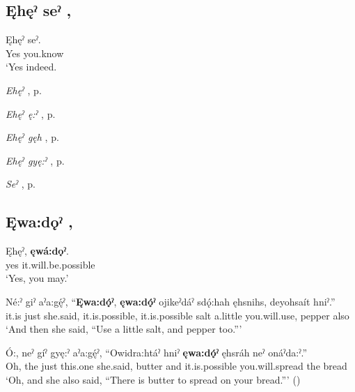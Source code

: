 \subsection*{\textbf{Ęhęˀ seˀ} , } \label{p:[ęhęˀ seˀ]}

\ea
\label{ex:enpart11}
\gll Ęhęˀ seˀ.\\
Yes you.know\\
\glt ‘Yes indeed.
\z

\begin{CayugaRelated}
\item \textit{Ehęˀ} , p. \pageref{p:[ęhęˀ]}\\
\item \textit{Ehęˀ ę:ˀ} , p. \pageref{p:[ęhęˀ ę:ˀ]}\\
\item \textit{Ehęˀ gęh} , p. \pageref{p:[ęhęˀ gęh]}\\
\item \textit{Ehęˀ gyę:ˀ} , p. \pageref{p:[ęhęˀ gyę:ˀ]}\\
\item \textit{Seˀ} , p. \pageref{p:[seˀ]}
\end{CayugaRelated}

\subsection*{\textbf{Ęwa:dǫˀ} , } \label{p:[ęwa:dǫˀ]}

\ea
\label{ex:enpart12}
\gll Ęhęˀ, \textbf{ęwá:dǫˀ}.\\
yes it.will.be.possible\\
\glt ‘Yes, you may.’
\z

\ea
\label{ex:enpart13}
\gll Né:ˀ giˀ aˀa:gę́ˀ, “\textbf{Ęwa:dǫ́ˀ}, \textbf{ęwa:dǫ́ˀ} ojikeˀdáˀ sdǫ́:hah ęhsnihs, deyohsaít hniˀ.”\\
it.is just she.said, it.is.possible, it.is.possible salt a.little you.will.use, pepper also\\
\glt ‘And then she said, “Use a little salt, and pepper too.”’
\z

\ea
\label{ex:enpart14}
\gll Ó:, neˀ gíˀ gyę:ˀ aˀa:gę́ˀ, “Owidra:htáˀ hniˀ \textbf{ęwa:dǫ́ˀ} ęhsráh neˀ onáˀda:ˀ.”\\
Oh, the just this.one she.said, butter and it.is.possible you.will.spread the bread\\
\glt ‘Oh, and she also said, “There is butter to spread on your bread.”’ (\cite{henry_de_2005})
\z

